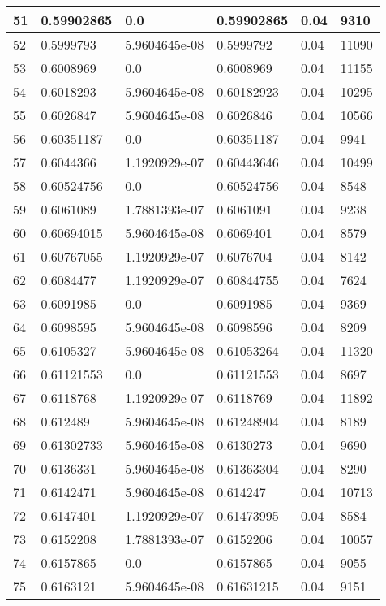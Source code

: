 \begin{longtable}{|l|l|l|l|l|l|}
51 & 0.59902865 & 0.0 & 0.59902865 & 0.04 & 9310 \\ \hline 
52 & 0.5999793 & 5.9604645e-08 & 0.5999792 & 0.04 & 11090 \\ \hline 
53 & 0.6008969 & 0.0 & 0.6008969 & 0.04 & 11155 \\ \hline 
54 & 0.6018293 & 5.9604645e-08 & 0.60182923 & 0.04 & 10295 \\ \hline 
55 & 0.6026847 & 5.9604645e-08 & 0.6026846 & 0.04 & 10566 \\ \hline 
56 & 0.60351187 & 0.0 & 0.60351187 & 0.04 & 9941 \\ \hline 
57 & 0.6044366 & 1.1920929e-07 & 0.60443646 & 0.04 & 10499 \\ \hline 
58 & 0.60524756 & 0.0 & 0.60524756 & 0.04 & 8548 \\ \hline 
59 & 0.6061089 & 1.7881393e-07 & 0.6061091 & 0.04 & 9238 \\ \hline 
60 & 0.60694015 & 5.9604645e-08 & 0.6069401 & 0.04 & 8579 \\ \hline 
61 & 0.60767055 & 1.1920929e-07 & 0.6076704 & 0.04 & 8142 \\ \hline 
62 & 0.6084477 & 1.1920929e-07 & 0.60844755 & 0.04 & 7624 \\ \hline 
63 & 0.6091985 & 0.0 & 0.6091985 & 0.04 & 9369 \\ \hline 
64 & 0.6098595 & 5.9604645e-08 & 0.6098596 & 0.04 & 8209 \\ \hline 
65 & 0.6105327 & 5.9604645e-08 & 0.61053264 & 0.04 & 11320 \\ \hline 
66 & 0.61121553 & 0.0 & 0.61121553 & 0.04 & 8697 \\ \hline 
67 & 0.6118768 & 1.1920929e-07 & 0.6118769 & 0.04 & 11892 \\ \hline 
68 & 0.612489 & 5.9604645e-08 & 0.61248904 & 0.04 & 8189 \\ \hline 
69 & 0.61302733 & 5.9604645e-08 & 0.6130273 & 0.04 & 9690 \\ \hline 
70 & 0.6136331 & 5.9604645e-08 & 0.61363304 & 0.04 & 8290 \\ \hline 
71 & 0.6142471 & 5.9604645e-08 & 0.614247 & 0.04 & 10713 \\ \hline 
72 & 0.6147401 & 1.1920929e-07 & 0.61473995 & 0.04 & 8584 \\ \hline 
73 & 0.6152208 & 1.7881393e-07 & 0.6152206 & 0.04 & 10057 \\ \hline 
74 & 0.6157865 & 0.0 & 0.6157865 & 0.04 & 9055 \\ \hline 
75 & 0.6163121 & 5.9604645e-08 & 0.61631215 & 0.04 & 9151 \\ \hline 
\end{longtable}
